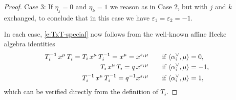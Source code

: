 \documentclass[12pt]{amsart}
\theoremstyle{definition}
\theoremstyle{remark}
\begin{document}
\begin{proof}
Case 3: If $\eta _{j} = 0$ and $\eta _{k} = 1$ we reason as in Case 2,
but with $j$ and $k$ exchanged, to conclude that in this case we have
$\varepsilon _{1} = \varepsilon _{2} = -1$.

In each case, \eqref{e:TxT-special} now follows from the well-known
affine Hecke algebra identities
\begin{equation}\label{e:TxT-general}
\begin{aligned}
T_{i}^{-1}\, x^{\mu }\, T_{i}^{} = T_{i}\, x^{\mu }\, T_{i}^{-1} =
x^{\mu } = x^{s_{i}\mu }
& \qquad 	\text{if $ \langle \alpha _{i}^{\vee }, \mu  \rangle = 0$},\\
T_{i}\, x^{\mu }\, T_{i} = q\, x^{s_{i}\mu }
& \qquad 	\text{if $ \langle \alpha _{i}^{\vee }, \mu  \rangle = -1$},\\
T_{i}^{-1}\, x^{\mu }\, T_{i}^{-1} = q^{-1} x^{s_{i}\mu }
& \qquad \text{if $ \langle \alpha _{i}^{\vee }, \mu \rangle = 1$},
\end{aligned}
\end{equation}
which can be verified directly from the definition of $T_{i}$.
\end{proof}
\end{document}
